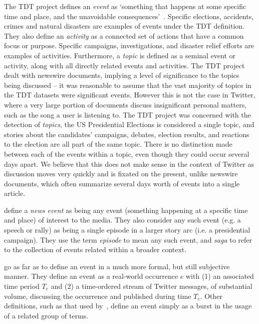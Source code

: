The TDT project defines an \emph{event} as `something that happens at some specific time and place, and the unavoidable consequences'~\citep{Allan:2002:ITD:772260.772262}.
Specific elections, accidents, crimes and natural disasters are examples of events under the TDT definition.
They also define an \emph{activity} as a connected set of actions that have a common focus or purpose.
Specific campaigns, investigations, and disaster relief efforts are examples of activities.
Furthermore, a \emph{topic} is defined as a seminal event or activity, along with all directly related events and activities.
The TDT project dealt with newswire documents, implying a level of significance to the topics being discussed -- it was reasonable to assume that the vast majority of topics in the TDT datasets were significant events.
However this is not the case in Twitter, where a very large portion of documents discuss insignificant personal matters, such as the song a user is listening to.
The TDT project was concerned with the detection of \emph{topics}, the US Presidential Elections is considered a single topic, and stories about the candidates' campaigns, debates, election results, and reactions to the election are all part of the same topic.
There is no distinction made between each of the events within a topic, even though they could occur several days apart.
We believe that this does not make sense in the context of Twitter as discussion moves very quickly and is fixated on the present, unlike newswire documents, which often summarize several days worth of events into a single article.

\cite{Aggarwal12} define a \emph{news event} as being any event (something happening at a specific time and place) of interest to the media.
They also consider any such event (e.g. a speech or rally) as being a single episode in a larger story arc (i.e. a presidential campaign).
They use the term \emph{episode} to mean any such event, and \emph{saga} to refer to the collection of events related within a broader context.

\cite{Becker_beyondtrending} go as far as to define an event in a much more formal, but still subjective manner.
They define an event as a real-world occurrence \(e\) with (1) an associated time period \(T_e\) and (2) a time-ordered stream of Twitter messages, of substantial volume, discussing the occurrence and published during time \(T_e\).
Other definitions, such as that used by~\cite{weng2011event}, define an event simply as a burst in the usage of a related group of terms.

